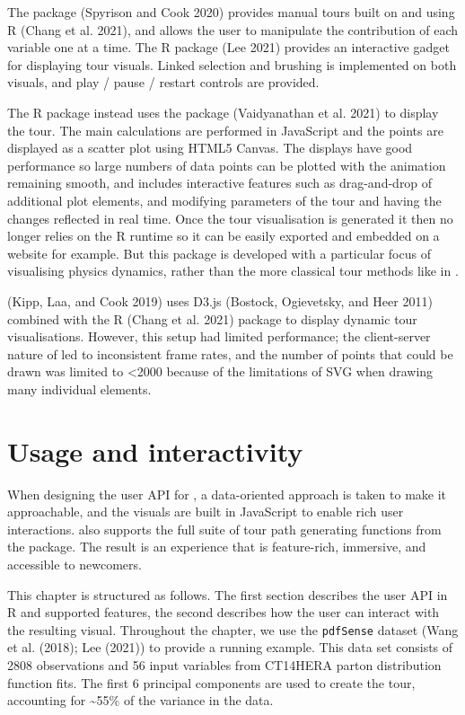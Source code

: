 The  package (Spyrison and Cook 2020) provides manual tours built on  and using R  (Chang et al. 2021), and allows the user to manipulate the contribution of each variable one at a time. The  R package (Lee 2021) provides an interactive gadget for displaying tour visuals. Linked selection and brushing is implemented on both visuals, and play / pause / restart controls are provided.

The  R package instead uses the  package (Vaidyanathan et al. 2021) to display the tour. The main calculations are performed in JavaScript and the points are displayed as a scatter plot using HTML5 Canvas. The displays have good performance so large numbers of data points can be plotted with the animation remaining smooth, and includes interactive features such as drag-and-drop of additional plot elements, and modifying parameters of the tour and having the changes reflected in real time. Once the tour visualisation is generated it then no longer relies on the R runtime so it can be easily exported and embedded on a website for example. But this package is developed with a particular focus of visualising physics dynamics, rather than the more classical tour methods like in .

(Kipp, Laa, and Cook 2019) uses D3.js (Bostock, Ogievetsky, and Heer 2011) combined with the R  (Chang et al. 2021) package to display dynamic tour visualisations. However, this setup had limited performance; the client-server nature of  led to inconsistent frame rates, and the number of points that could be drawn was limited to \textless2000 because of the limitations of SVG when drawing many individual elements.

\hypertarget{usage-and-interactivity}{%
\section{Usage and interactivity}\label{usage-and-interactivity}}

When designing the user API for , a data-oriented approach is taken to make it approachable, and the visuals are built in JavaScript to enable rich user interactions.  also supports the full suite of tour path generating functions from the  package. The result is an experience that is feature-rich, immersive, and accessible to newcomers.

This chapter is structured as follows. The first section describes the user API in R and supported features, the second describes how the user can interact with the resulting visual. Throughout the chapter, we use the \texttt{pdfSense} dataset (Wang et al. (2018); Lee (2021)) to provide a running example. This data set consists of 2808 observations and 56 input variables from CT14HERA parton distribution function fits. The first 6 principal components are used to create the tour, accounting for \textasciitilde55\% of the variance in the data.

